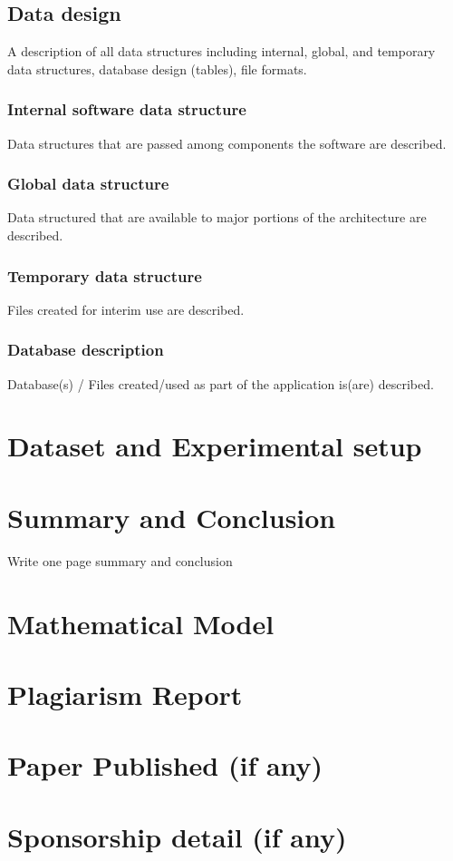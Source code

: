 \documentclass[oneside,a4paper,12pt]{report}
\begin{document}
\section{Data design }   
A description of all data structures including internal, global, and temporary data structures, database design (tables), file formats.
\subsection{Internal software data structure}
Data structures that are passed among components the software are described.
\subsection{Global data structure}
Data structured that are available to major portions of the architecture are described.
\subsection{Temporary data structure}
Files created for interim use are described.
\subsection{Database description}
Database(s) / Files created/used  as part of the application is(are) described.

 \chapter{Dataset and Experimental setup}


 
 
 \chapter{Summary and Conclusion}
Write one page summary and conclusion 




\begin{appendices}


\chapter{Mathematical Model}











\chapter{Plagiarism Report }


\chapter{Paper Published (if any)}

\chapter{Sponsorship detail (if any)}



\end{appendices}
\end{document}
